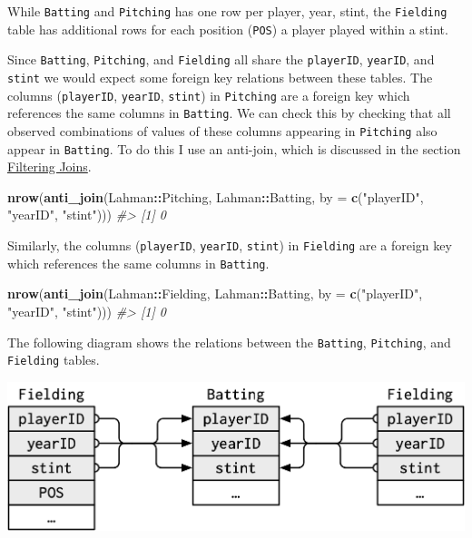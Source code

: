 \documentclass[]{book}
\newenvironment{Shaded}{\begin{snugshade}}{\end{snugshade}}
\newcommand{\CommentTok}[1]{\textcolor[rgb]{0.56,0.35,0.01}{\textit{#1}}}
\newcommand{\DataTypeTok}[1]{\textcolor[rgb]{0.13,0.29,0.53}{#1}}
\newcommand{\KeywordTok}[1]{\textcolor[rgb]{0.13,0.29,0.53}{\textbf{#1}}}
\newcommand{\NormalTok}[1]{#1}
\newcommand{\OperatorTok}[1]{\textcolor[rgb]{0.81,0.36,0.00}{\textbf{#1}}}
\newcommand{\StringTok}[1]{\textcolor[rgb]{0.31,0.60,0.02}{#1}}
\theoremstyle{plain}
\theoremstyle{remark}
\begin{document}
While \texttt{Batting} and \texttt{Pitching} has one row per player, year, stint, the \texttt{Fielding}
table has additional rows for each position (\texttt{POS}) a player played within a stint.

Since \texttt{Batting}, \texttt{Pitching}, and \texttt{Fielding} all share the \texttt{playerID}, \texttt{yearID}, and \texttt{stint}
we would expect some foreign key relations between these tables.
The columns (\texttt{playerID}, \texttt{yearID}, \texttt{stint}) in \texttt{Pitching} are a foreign key which
references the same columns in \texttt{Batting}. We can check this by checking that
all observed combinations of values of these columns appearing in \texttt{Pitching}
also appear in \texttt{Batting}. To do this I use an anti-join, which is discussed
in the section \href{https://r4ds.had.co.nz/relational-data.html\#filtering-joins}{Filtering Joins}.

\begin{Shaded}
\begin{Highlighting}[]
\KeywordTok{nrow}\NormalTok{(}\KeywordTok{anti_join}\NormalTok{(Lahman}\OperatorTok{::}\NormalTok{Pitching, Lahman}\OperatorTok{::}\NormalTok{Batting, }
               \DataTypeTok{by =} \KeywordTok{c}\NormalTok{(}\StringTok{"playerID"}\NormalTok{, }\StringTok{"yearID"}\NormalTok{, }\StringTok{"stint"}\NormalTok{)))}
\CommentTok{#> [1] 0}
\end{Highlighting}
\end{Shaded}

Similarly, the columns (\texttt{playerID}, \texttt{yearID}, \texttt{stint}) in \texttt{Fielding} are a foreign key which references the same columns in \texttt{Batting}.

\begin{Shaded}
\begin{Highlighting}[]
\KeywordTok{nrow}\NormalTok{(}\KeywordTok{anti_join}\NormalTok{(Lahman}\OperatorTok{::}\NormalTok{Fielding, Lahman}\OperatorTok{::}\NormalTok{Batting,}
               \DataTypeTok{by =} \KeywordTok{c}\NormalTok{(}\StringTok{"playerID"}\NormalTok{, }\StringTok{"yearID"}\NormalTok{, }\StringTok{"stint"}\NormalTok{)))}
\CommentTok{#> [1] 0}
\end{Highlighting}
\end{Shaded}

The following diagram shows the relations between the \texttt{Batting}, \texttt{Pitching}, and
\texttt{Fielding} tables.

\begin{center}\includegraphics[width=14.21in]{diagrams/Lahman3} \end{center}
\end{document}
